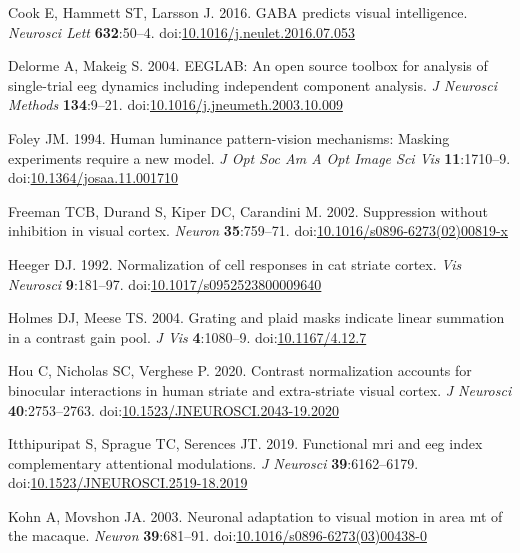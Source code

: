 \documentclass[]{article}
\begin{document}
\leavevmode\hypertarget{ref-Cook2016}{}%
Cook E, Hammett ST, Larsson J. 2016. GABA predicts visual intelligence. \emph{Neurosci Lett} \textbf{632}:50--4. doi:\href{https://doi.org/10.1016/j.neulet.2016.07.053}{10.1016/j.neulet.2016.07.053}

\leavevmode\hypertarget{ref-Delorme2004}{}%
Delorme A, Makeig S. 2004. EEGLAB: An open source toolbox for analysis of single-trial eeg dynamics including independent component analysis. \emph{J Neurosci Methods} \textbf{134}:9--21. doi:\href{https://doi.org/10.1016/j.jneumeth.2003.10.009}{10.1016/j.jneumeth.2003.10.009}

\leavevmode\hypertarget{ref-Foley1994}{}%
Foley JM. 1994. Human luminance pattern-vision mechanisms: Masking experiments require a new model. \emph{J Opt Soc Am A Opt Image Sci Vis} \textbf{11}:1710--9. doi:\href{https://doi.org/10.1364/josaa.11.001710}{10.1364/josaa.11.001710}

\leavevmode\hypertarget{ref-Freeman2002}{}%
Freeman TCB, Durand S, Kiper DC, Carandini M. 2002. Suppression without inhibition in visual cortex. \emph{Neuron} \textbf{35}:759--71. doi:\href{https://doi.org/10.1016/s0896-6273(02)00819-x}{10.1016/s0896-6273(02)00819-x}

\leavevmode\hypertarget{ref-Heeger1992}{}%
Heeger DJ. 1992. Normalization of cell responses in cat striate cortex. \emph{Vis Neurosci} \textbf{9}:181--97. doi:\href{https://doi.org/10.1017/s0952523800009640}{10.1017/s0952523800009640}

\leavevmode\hypertarget{ref-Holmes2004}{}%
Holmes DJ, Meese TS. 2004. Grating and plaid masks indicate linear summation in a contrast gain pool. \emph{J Vis} \textbf{4}:1080--9. doi:\href{https://doi.org/10.1167/4.12.7}{10.1167/4.12.7}

\leavevmode\hypertarget{ref-Hou2020}{}%
Hou C, Nicholas SC, Verghese P. 2020. Contrast normalization accounts for binocular interactions in human striate and extra-striate visual cortex. \emph{J Neurosci} \textbf{40}:2753--2763. doi:\href{https://doi.org/10.1523/JNEUROSCI.2043-19.2020}{10.1523/JNEUROSCI.2043-19.2020}

\leavevmode\hypertarget{ref-Itthipuripat2019}{}%
Itthipuripat S, Sprague TC, Serences JT. 2019. Functional mri and eeg index complementary attentional modulations. \emph{J Neurosci} \textbf{39}:6162--6179. doi:\href{https://doi.org/10.1523/JNEUROSCI.2519-18.2019}{10.1523/JNEUROSCI.2519-18.2019}

\leavevmode\hypertarget{ref-Kohn2003}{}%
Kohn A, Movshon JA. 2003. Neuronal adaptation to visual motion in area mt of the macaque. \emph{Neuron} \textbf{39}:681--91. doi:\href{https://doi.org/10.1016/s0896-6273(03)00438-0}{10.1016/s0896-6273(03)00438-0}
\end{document}
